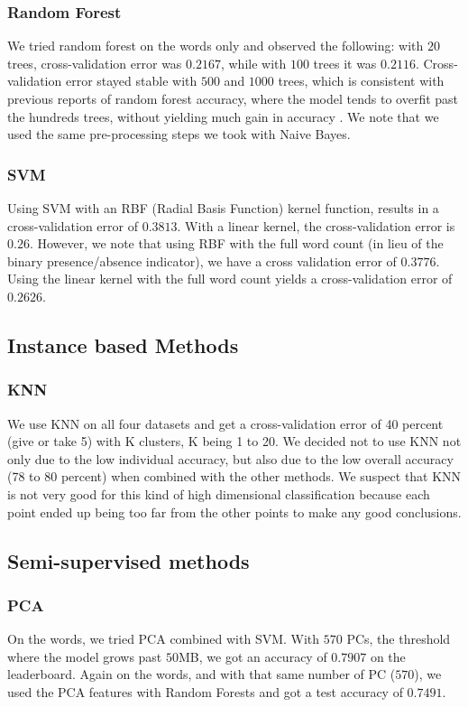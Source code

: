 \documentclass[11pt,twocolumn]{report}
\begin{document}
     \subsubsection{Random Forest}
     We tried random forest on the words only and observed the following: with $20$ trees, cross-validation error was $0.2167$, while with $100$ trees it was $0.2116$. Cross-validation error stayed stable with $500$ and $1000$ trees, which is consistent with previous reports of random forest accuracy, where the model tends to overfit past the hundreds trees, without yielding much gain in accuracy \cite{latinne2001limiting,oshiro2012many}. We note that we used the same pre-processing steps we took with Naive Bayes.

    \subsubsection{SVM}
    Using SVM with an RBF (Radial Basis Function) kernel function, results in a cross-validation error of $0.3813$. With a linear kernel, the cross-validation error is $0.26$. However, we note that using RBF with the full word count (in lieu of the binary presence/absence indicator), we have a cross validation error of $0.3776$. Using the linear kernel with the full word count yields a cross-validation error of $0.2626$.
    
    \subsection*{Instance based Methods}
    \subsubsection{KNN}
    
    We use KNN on all four datasets and get a cross-validation error of 40 percent (give or take 5) with K clusters, K being 1 to 20. We decided not to use KNN not only due to the low individual accuracy, but also due to the low overall accuracy (78 to 80 percent) when combined with the other methods. We suspect that KNN is not very good for this kind of high dimensional classification because each point ended up being too far from the other points to make any good conclusions. 
   
    \subsection*{Semi-supervised methods}
    \subsubsection*{PCA}
    On the words, we tried PCA combined with SVM. With $570$ PCs, the threshold where the model grows past $50$MB, we got an accuracy of $0.7907$ on the leaderboard. Again on the words, and with that same number of PC ($570$), we used the PCA features with Random Forests and got a test accuracy of $0.7491$.
\end{document}
